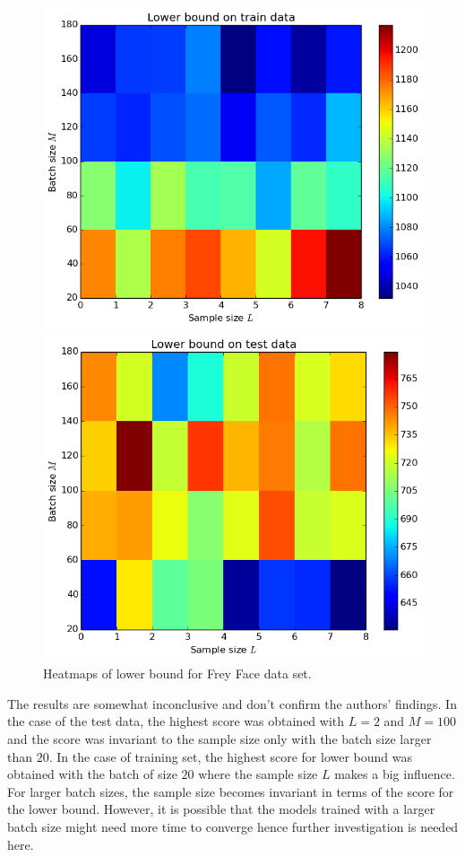 \documentclass[../report/report.tex]{subfiles}
\begin{document}
\begin{figure}[!htb]
%
\begin{center}
\includegraphics[width=0.7\linewidth]{../../res/heatMapTraining}
\end{center}
\endminipage 
{}  
\begin{center}
\includegraphics[width=0.7\linewidth]{../../res/heatMapValid}
\end{center}
\endminipage\hfill
  \caption[1]{Heatmaps of lower bound for Frey Face data set.}
  \label{fig:heatmaps}
\end{figure}

The results are somewhat inconclusive and don't confirm the authors' findings. In the case of the test data, the highest score was obtained with $L=2$ and $M=100$ and the score was invariant to the sample size only with the batch size larger than $20$. In the case of training set, the highest score for lower bound was obtained with the batch of size $20$ where the sample size $L$ makes a big influence. For larger batch sizes, the sample size becomes invariant in terms of the score for the lower bound. However, it is possible that the models trained with a larger batch size might need more time to converge hence further investigation is needed here.
\end{document}
